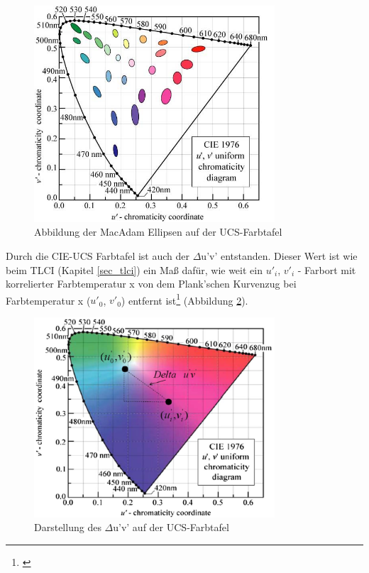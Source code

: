 \begin{figure}[H]     %
\centering
\includegraphics[width=0.8\textwidth]{bilder/ucs} 
\caption {Abbildung der MacAdam Ellipsen auf der UCS-Farbtafel \protect\footnotemark}\label{b_ucs}
\end{figure}


\newpage
\noindent Durch die CIE-UCS Farbtafel ist auch der $\Delta$u'v' entstanden. Dieser Wert ist wie beim TLCI (Kapitel \ref{sec_tlci}) ein Maß dafür, wie weit ein $u'_{i}$, $v'_{i}$ - Farbort mit korrelierter Farbtemperatur x von dem Plank'schen Kurvenzug bei Farbtemperatur x ($u'_{0}$, $v'_{0}$) entfernt ist\footnote{\cite[566]{jiyupe}} (Abbildung \ref{b_duv}).

\begin{figure}[H]     %
\centering
\includegraphics[width=0.8\textwidth]{bilder/duv1} 
\caption {Darstellung des $\Delta$u'v' auf der UCS-Farbtafel}\label{b_duv}
\end{figure}


